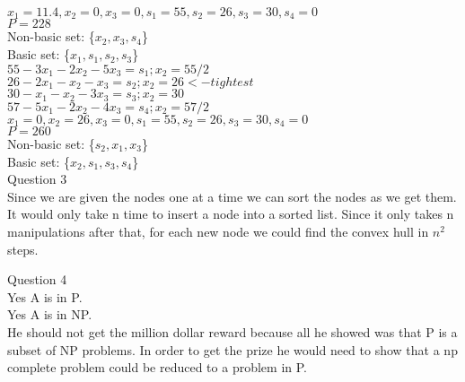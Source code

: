 \documentclass{article}
\begin{document}
${      x_1 = 11.4, x_2 = 0, x_3 = 0, s_1 = 55, s_2 = 26, s_3 = 30, s_4 = 0}$\\
${P = 228}$\\
Non-basic set: \{${x_2, x_3, s_4}$\}\\
Basic set: \{${x_1, s_1, s_2, s_3}$\}\\





${     55 - 3x_1 -  2x_2 -  5x_3 = s_1; x_2 = 55/2}$\\
${     26 - 2x_1 -   x_2 -   x_3 = s_2; x_2 = 26<-tightest}$\\
${     30 -  x_1 -   x_2 -  3x_3 = s_3; x_2 = 30}$\\
${     57 - 5x_1 -  2x_2 -  4x_3 = s_4; x_2 = 57/2}$\\

${      x_1 = 0, x_2 = 26, x_3 = 0, s_1 = 55, s_2 = 26, s_3 = 30, s_4 = 0}$\\
${P = 260}$\\
Non-basic set: \{${s_2, x_1, x_3}$\}\\
Basic set: \{${x_2, s_1, s_3, s_4}$\}\\


Question 3\\
Since we are given the nodes one at a time we can sort the nodes as we get them. 
It would only take n time to insert a node into a sorted list.
Since it only takes n manipulations after that, for each new node we could find the convex hull in ${n^2}$ steps.

Question 4\\
Yes A is in P.\\
Yes A is in NP.\\
He should not get the million dollar reward because all he showed was that P is a subset of NP problems.
In order to get the prize he would need to show that a np complete problem could be reduced to a problem in P.\\
\end{document}
